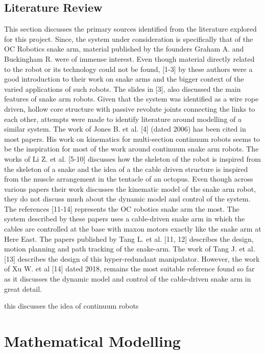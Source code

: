 \documentclass[a4paper,12pt]{report}
\begin{document}
\section{Literature Review}
This section discusses the primary sources identified from the literature explored for this project.
Since, the system under consideration is specifically that of the OC Robotics snake arm, material published by the founders Graham A. and Buckingham R. were of immense interest. Even though material directly related to the robot or its technology could not be found, [1-3] by these authors were a good introduction to their work on snake arms and the bigger context of the  varied applications of such robots. The slides in [3], also discussed the main features of  snake arm robots.
Given that the system was identified as a wire rope driven, hollow core structure with passive revolute joints connecting the links to each other, attempts were made to identify literature around modelling of a similar system. The work of Jones B. et al. [4] (dated 2006) has been cited in most papers. His work on kinematics for multi-section continuum robots seems to be the inspiration for most of the work around continuum snake arm robots. The works of Li Z. et al. [5-10] discusses how the skeleton of the robot is inspired from the skeleton of a snake and the idea of a the cable driven structure is inspired from the muscle arrangement in the tentacle of an octopus. Even though across various papers their work discusses the kinematic model of the snake arm robot, they do not discuss much about the dynamic model and control of the system. The references [11-14] represents the OC robotics snake arm the most. The system described by these papers uses a cable-driven snake arm in which the cables are controlled at the base with maxon motors exactly like the snake arm at Here East. The papers published by Tang L. et al. [11, 12] describes the design, motion planning and path tracking of the snake-arm. The work of Tang J. et al. [13] describes the design of this hyper-redundant manipulator. However, the work of Xu W. et al [14] dated 2018, remains the most suitable reference found so far as it discusses the dynamic model and control of the cable-driven snake arm in great detail. 

\cite{singh2014continuum} this discusses the idea of continuum robots 



\chapter{Mathematical Modelling}
\end{document}
